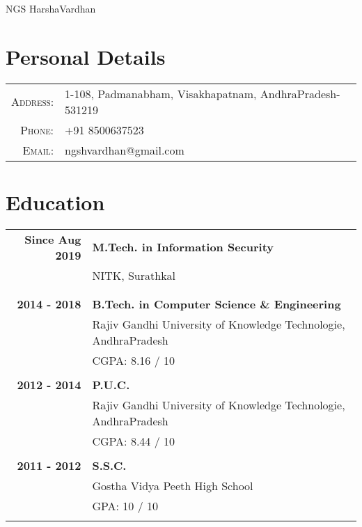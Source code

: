 \documentclass[a4paper, 10pt]{article}
\begin{document}
\pagestyle{empty}

\par{\centering
		{\Huge NGS HarshaVardhan}
\bigskip\par}

\section{Personal Details}

\begin{tabular}{rl}
	\textsc{Address: } & 1-108, Padmanabham, Visakhapatnam, AndhraPradesh-531219\\
	\textsc{Phone: } & +91 8500637523\\
	\textsc{Email: } & ngshvardhan@gmail.com
\end{tabular}

\par\vspace{\parskip}

\section{Education}
\begin{tabular}{rl}

\textbf{Since Aug 2019} & \textbf{M.Tech. in Information Security}\\
& NITK, Surathkal\\
& \\ & \\

\textbf{2014 - 2018} & \textbf{B.Tech. in Computer Science \& Engineering}\\
& Rajiv Gandhi University of Knowledge Technologie, AndhraPradesh\\
& \textsc{CGPA: } 8.16 / 10\\&\\

\textbf{2012 - 2014} & \textbf{P.U.C.} \\
& Rajiv Gandhi University of Knowledge Technologie, AndhraPradesh\\
& \textsc{CGPA: } 8.44 / 10\\&\\

\textbf{2011 - 2012} & \textbf{S.S.C.}\\
& Gostha Vidya Peeth High School\\
& \textsc{GPA: } 10 / 10\\&\\

\end{tabular}
\end{document}
